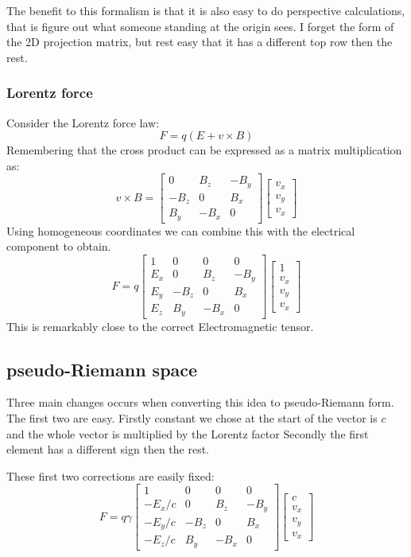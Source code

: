 The benefit to this formalism is that it is also easy to do perspective calculations, that is figure out what someone standing at the origin sees.
I forget the form of the 2D projection matrix, but rest easy that it has a different top row then the rest.
\subsubsection{Lorentz force}
Consider the Lorentz force law:
\[F = q(E+v\times B)\]
Remembering that the cross product can be expressed as a matrix multiplication as:
\[v\times B = \begin{bmatrix}0 & B_z & -B_y \\ -B_z & 0 & B_x \\ B_y & -B_x & 0 \end{bmatrix}\begin{bmatrix}v_x \\ v_y \\ v_x \end{bmatrix}\]
Using homogeneous coordinates we can combine this with the electrical component to obtain.
\[ F= q\begin{bmatrix}1 & 0 & 0 & 0 \\E_x & 0 & B_z & -B_y \\ E_y & -B_z & 0 & B_x \\ E_z & B_y & -B_x & 0 \end{bmatrix}\begin{bmatrix}1 \\v_x \\ v_y \\ v_x \end{bmatrix}\]
This is remarkably close to the correct Electromagnetic tensor.

\subsection{pseudo-Riemann space}
Three main changes occurs when converting this idea to pseudo-Riemann form.
The first two are easy.
Firstly constant we chose at the start of the vector is $c$ and the whole vector is multiplied by the Lorentz factor 
Secondly the first element has a different sign then the rest.

These first two corrections are easily fixed:
\[ F= q\gamma\begin{bmatrix}1 & 0 & 0 & 0 \\-E_x/c & 0 & B_z & -B_y \\ -E_y/c & -B_z & 0 & B_x \\ -E_z/c & B_y & -B_x & 0 \end{bmatrix}\begin{bmatrix}c \\v_x \\ v_y \\ v_x \end{bmatrix}\]

